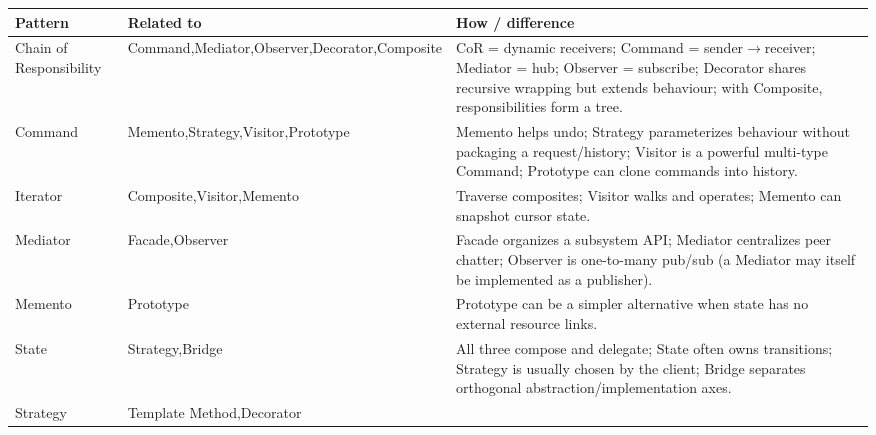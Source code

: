 \newpage
\begin{table}[H]
    \setlength{\tabcolsep}{4pt}
    \begin{tabularx}{\textwidth}{%
        |>{\raggedright\arraybackslash}p{}%
        |>{\raggedright\arraybackslash}p{}%
        |X|}
        \hline
        \textbf{Pattern} & \textbf{Related to} & \textbf{How / difference} \\
        \hline
        Chain of Responsibility & Command,\newline Mediator,\newline Observer,\newline Decorator,\newline Composite &
        CoR = dynamic receivers; Command = sender$\to$receiver; Mediator = hub; Observer = subscribe; Decorator shares recursive wrapping but extends behaviour; with Composite, responsibilities form a tree. \\
        \hline
        Command & Memento,\newline Strategy,\newline Visitor,\newline Prototype &
        Memento helps undo; Strategy parameterizes behaviour without packaging a request/history; Visitor is a powerful multi-type Command; Prototype can clone commands into history. \\
        \hline
        Iterator & Composite,\newline Visitor,\newline Memento &
        Traverse composites; Visitor walks and operates; Memento can snapshot cursor state. \\
        \hline
        Mediator & Facade,\newline Observer &
        Facade organizes a subsystem API; Mediator centralizes peer chatter; Observer is one-to-many pub/sub (a Mediator may itself be implemented as a publisher). \\
        \hline
        Memento & Prototype & Prototype can be a simpler alternative when state has no external resource links. \\
        \hline
        State & Strategy,\newline Bridge &
        All three compose and delegate; State often owns transitions; Strategy is usually chosen by the client; Bridge separates orthogonal abstraction/implementation axes. \\
        \hline
        Strategy & Template Method,\newline Decorator &

\end{tabularx}
\end{table}
